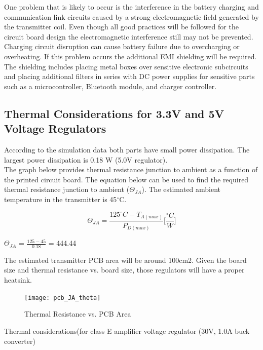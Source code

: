 \documentclass[12pt]{article}
\begin{document}
\pagebreak

\indent
One problem that is likely to occur is the interference in the battery charging and communication link circuits caused by a strong electromagnetic field generated by the transmitter coil. Even though all good practices will be followed for the circuit board design the electromagnetic interference still may not be prevented. Charging circuit disruption can cause battery failure due to overcharging or overheating. If this problem occurs the additional EMI shielding will be required. The shielding includes placing metal boxes over sensitive electronic subcircuits and placing additional filters in series with DC power supplies for sensitive parts such as a microcontroller, Bluetooth module, and charger controller.

\subsection{Thermal Considerations for 3.3V and 5V Voltage Regulators}

\indent \indent
According to the simulation data both parts have small power dissipation. The largest power dissipation is 0.18 W (5.0V regulator).\\

\indent
The graph below provides thermal resistance junction to ambient as a function of the printed circuit board. The equation below can be used to find the required thermal resistance junction to ambient ($\Theta_{JA}$). The estimated ambient temperature in the transmitter is 45$^{\circ}$C.

\begin{equation}
\Theta_{JA} = \frac{125^\circ C - T_{A(max)}}{P_{D(max)}} \Bigg[\frac{^\circ C}{W}\Bigg]
\end{equation}

\noindent
$\Theta_{JA}$ = $\frac{125-45}{0.18}$ = 444.44 

\noindent
The estimated transmitter PCB area will be around 100cm2. Given the board size and thermal resistance vs. board size, those regulators will have a proper heatsink.

\begin{figure}[h!]
\centering
\texttt{[image: pcb\_JA\_theta]}
\caption{Thermal Resistance vs. PCB Area \cite{TPSM265R1}}
\end{figure}

\pagebreak

\noindent
Thermal considerations(for class E amplifier voltage regulator (30V, 1.0A buck converter) 
\end{document}
